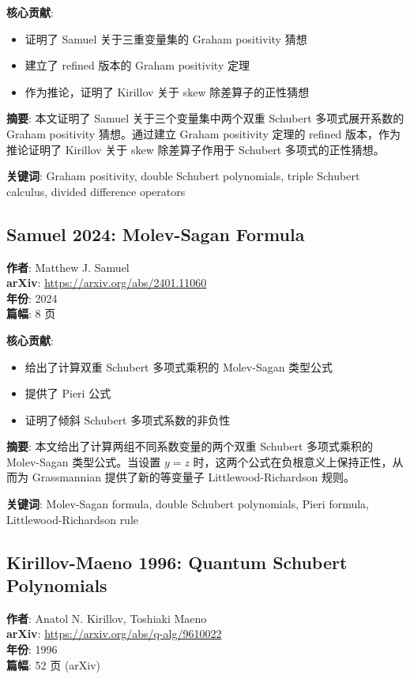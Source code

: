 \textbf{核心贡献}:
\begin{itemize}
\item 证明了 Samuel 关于三重变量集的 Graham positivity 猜想
\item 建立了 refined 版本的 Graham positivity 定理
\item 作为推论，证明了 Kirillov 关于 skew 除差算子的正性猜想
\end{itemize}

\textbf{摘要}: 本文证明了 Samuel 关于三个变量集中两个双重 Schubert 多项式展开系数的 Graham positivity 猜想。通过建立 Graham positivity 定理的 refined 版本，作为推论证明了 Kirillov 关于 skew 除差算子作用于 Schubert 多项式的正性猜想。

\textbf{关键词}: Graham positivity, double Schubert polynomials, triple Schubert calculus, divided difference operators

\subsection{Samuel 2024: Molev-Sagan Formula}
\textbf{作者}: Matthew J. Samuel \\
\textbf{arXiv}: \url{https://arxiv.org/abs/2401.11060} \\
\textbf{年份}: 2024 \\
\textbf{篇幅}: 8 页

\textbf{核心贡献}:
\begin{itemize}
\item 给出了计算双重 Schubert 多项式乘积的 Molev-Sagan 类型公式
\item 提供了 Pieri 公式
\item 证明了倾斜 Schubert 多项式系数的非负性
\end{itemize}

\textbf{摘要}: 本文给出了计算两组不同系数变量的两个双重 Schubert 多项式乘积的 Molev-Sagan 类型公式。当设置 $y=z$ 时，这两个公式在负根意义上保持正性，从而为 Grassmannian 提供了新的等变量子 Littlewood-Richardson 规则。

\textbf{关键词}: Molev-Sagan formula, double Schubert polynomials, Pieri formula, Littlewood-Richardson rule

\subsection{Kirillov-Maeno 1996: Quantum Schubert Polynomials}
\textbf{作者}: Anatol N. Kirillov, Toshiaki Maeno \\
\textbf{arXiv}: \url{https://arxiv.org/abs/q-alg/9610022} \\
\textbf{年份}: 1996 \\
\textbf{篇幅}: 52 页 (arXiv)

